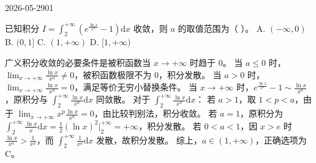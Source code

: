 \begin{mistake}{2026-05-29}{01}

\begin{problemcontent}
已知积分 \( I = \int_2^{+\infty} \left( e^{\frac{\ln x}{x^a}} - 1 \right) \mathrm{d}x \) 收敛，则 \( a \) 的取值范围为（ ）。
A. \( (-\infty, 0) \)
B. \( (0, 1] \)
C. \( (1, +\infty) \)
D. \( [1, +\infty) \)
\end{problemcontent}

\begin{solutioncontent}
广义积分收敛的必要条件是被积函数当 \( x \to +\infty \) 时趋于 0。
当 \( a \le 0 \) 时，\( \lim_{x \to +\infty} \frac{\ln x}{x^a} \neq 0 \)，被积函数极限不为 0，积分发散。
当 \( a > 0 \) 时，\( \lim_{x \to +\infty} \frac{\ln x}{x^a} = 0 \)，满足等价无穷小替换条件。
当 \( x \to +\infty \) 时，\( e^{\frac{\ln x}{x^a}} - 1 \sim \frac{\ln x}{x^a} \)，原积分与 \( \int_2^{+\infty} \frac{\ln x}{x^a} \mathrm{d}x \) 同敛散。
对于 \( \int_2^{+\infty} \frac{\ln x}{x^a} \mathrm{d}x \)：
若 \( a > 1 \)，取 \( 1 < p < a \)，由于 \( \lim_{x \to +\infty} x^p \frac{\ln x}{x^a} = 0 \)，由比较判别法，积分收敛。
若 \( a = 1 \)，原积分为 \( \int_2^{+\infty} \frac{\ln x}{x} \mathrm{d}x = \frac{1}{2}(\ln x)^2 \Big|_2^{+\infty} = +\infty \)，积分发散。
若 \( 0 < a < 1 \)，因 \( x > e \) 时 \( \frac{\ln x}{x^a} > \frac{1}{x^a} \)，而 \( \int_2^{+\infty} \frac{1}{x^a} \mathrm{d}x \) 发散，故积分发散。
综上，\( a \in (1, +\infty) \)，正确选项为 C。
\end{solutioncontent}


\end{mistake}
